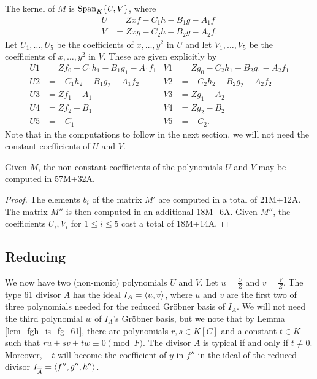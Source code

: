 The kernel of $M$ is $\operatorname{Span}_K\{U,V\}$, where
\begin{align*}
  U &= Zxf - C_1h - B_1g - A_1f \\
  V &= Zxg - C_2h - B_2g - A_2f.
\end{align*}
Let $U_1, \ldots, U_5$ be the coefficients of $x, \ldots, y^2$ in $U$
and let $V_1, \ldots, V_5$ be the coefficients of $x, \ldots, y^2$ in $V$.
These are given explicitly by
\begin{align*}
  U1 &= Zf_0 - C_1h_1 - B_1g_1 - A_1f_1 & V1 &= Zg_0 - C_2h_1 - B_2g_1 - A_2f_1 \\
  U2 &=      - C_1h_2 - B_1g_2 - A_1f_2 & V2 &=      - C_2h_2 - B_2g_2 - A_2f_2 \\
  U3 &= Zf_1 - A_1 & V3 &= Zg_1 - A_2 \\
  U4 &= Zf_2 - B_1 & V4 &= Zg_2 - B_2 \\
  U5 &=      - C_1 & V5 &=      - C_2.
\end{align*}
Note that in the computations to follow in the next section,
we will not need the constant coefficients of $U$ and $V$.

\begin{lemma}
  \label{lem_UV_op_count}
  Given $M$, the non-constant coefficients of the polynomials $U$ and $V$ may be computed in 57M+32A.
\end{lemma}
\begin{proof}
  The elements $b_i$ of the matrix $M'$ are computed in a total of 21M+12A.
  The matrix $M''$ is then computed in an additional 18M+6A.
  Given $M''$, the coefficients $U_i, V_i$ for $1 \leq i \leq 5$ cost a total of 18M+14A.
\end{proof}




\subsection{Reducing}

We now have two (non-monic) polynomials $U$ and $V$.
Let $u = \frac U Z$ and $v = \frac V Z$.
The type 61 divisor $A$ has the ideal $I_A = \left\langle u, v \right\rangle$,
where $u$ and $v$ are the first two of three polynomials needed for the reduced Gr\"obner basis of $I_A$.
We will not need the third polynomial $w$ of $I_A$'s Gr\"obner basis,
but we note that by Lemma \ref{lem_fgh_is_fg_61},
there are polynomials $r,s \in K[C]$ and a constant $t \in K$
such that $ru + sv + tw \equiv 0 \pmod F$.
The divisor $A$ is typical if and only if $t \neq 0$.
Moreover, $-t$ will become the coefficient of $y$ in $f''$ in the ideal of the reduced divisor
$I_{\overline{\overline{A}}} = \left\langle f'', g'', h'' \right\rangle$.

